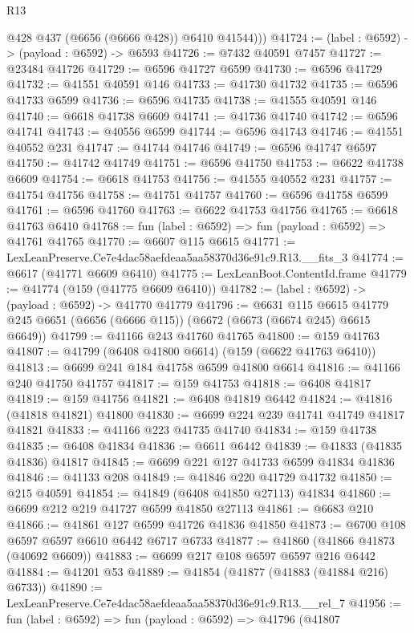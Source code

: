 \begin{lexlean}{R13}
\begin{coremodule}
          @428
          @437
          (@6656 (@6666 @428))
          @6410
          @41544)))
@41724 := (label : @6592) -> (payload : @6592) -> @6593
@41726 := @7432 @40591 @7457
@41727 := @23484 @41726
@41729 := @6596 @41727 @6599
@41730 := @6596 @41729
@41732 := @41551 @40591 @146
@41733 := @41730 @41732
@41735 := @6596 @41733 @6599
@41736 := @6596 @41735
@41738 := @41555 @40591 @146
@41740 := @6618 @41738 @6609
@41741 := @41736 @41740
@41742 := @6596 @41741
@41743 := @40556 @6599
@41744 := @6596 @41743
@41746 := @41551 @40552 @231
@41747 := @41744 @41746
@41749 := @6596 @41747 @6597
@41750 := @41742 @41749
@41751 := @6596 @41750
@41753 := @6622 @41738 @6609
@41754 := @6618 @41753
@41756 := @41555 @40552 @231
@41757 := @41754 @41756
@41758 := @41751 @41757
@41760 := @6596 @41758 @6599
@41761 := @6596 @41760
@41763 := @6622 @41753 @41756
@41765 := @6618 @41763 @6410
@41768 := fun (label : @6592) => fun (payload : @6592) => @41761 @41765
@41770 := @6607 @115 @6615
@41771 := LexLeanPreserve.Ce7e4dac58aefdeaa5aa58370d36e91c9.R13.__fits_3
@41774 := @6617 (@41771 @6609 @6410)
@41775 := LexLeanBoot.ContentId.frame
@41779 := @41774 (@159 (@41775 @6609 @6410))
@41782 := (label : @6592) -> (payload : @6592) -> @41770 @41779
@41796 := @6631
    @115
    @6615
    @41779
    @245
    @6651
    (@6656 (@6666 @115))
    (@6672 (@6673 (@6674 @245) @6615 @6649))
@41799 := @41166 @243 @41760 @41765
@41800 := @159 @41763
@41807 := @41799 (@6408 @41800 @6614) (@159 (@6622 @41763 @6410))
@41813 := @6699 @241 @184 @41758 @6599 @41800 @6614
@41816 := @41166 @240 @41750 @41757
@41817 := @159 @41753
@41818 := @6408 @41817
@41819 := @159 @41756
@41821 := @6408 @41819 @6442
@41824 := @41816 (@41818 @41821) @41800
@41830 := @6699 @224 @239 @41741 @41749 @41817 @41821
@41833 := @41166 @223 @41735 @41740
@41834 := @159 @41738
@41835 := @6408 @41834
@41836 := @6611 @6442
@41839 := @41833 (@41835 @41836) @41817
@41845 := @6699 @221 @127 @41733 @6599 @41834 @41836
@41846 := @41133 @208
@41849 := @41846 @220 @41729 @41732
@41850 := @215 @40591
@41854 := @41849 (@6408 @41850 @27113) @41834
@41860 := @6699 @212 @219 @41727 @6599 @41850 @27113
@41861 := @6683 @210
@41866 := @41861 @127 @6599 @41726 @41836 @41850
@41873 := @6700 @108 @6597 @6597 @6610 @6442 @6717 @6733
@41877 := @41860 (@41866 @41873 (@40692 @6609))
@41883 := @6699 @217 @108 @6597 @6597 @216 @6442
@41884 := @41201 @53
@41889 := @41854 (@41877 (@41883 (@41884 @216) @6733))
@41890 := LexLeanPreserve.Ce7e4dac58aefdeaa5aa58370d36e91c9.R13.__rel_7
@41956 := fun (label : @6592) =>
  fun (payload : @6592) =>
  @41796
    (@41807

\end{coremodule}
\end{lexlean}
